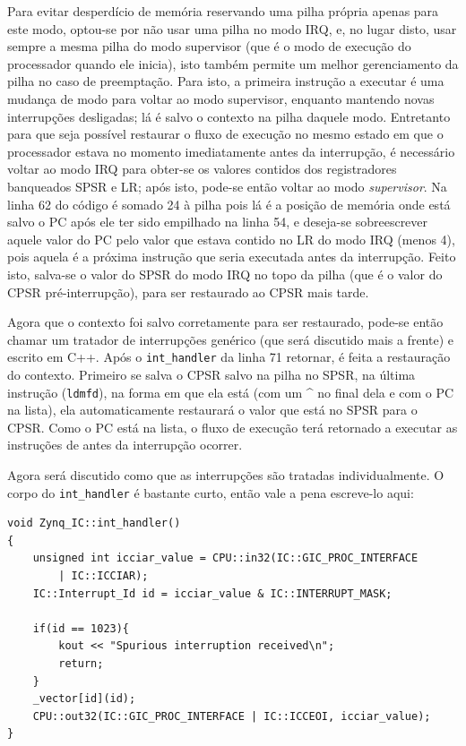 Para evitar desperdício de memória reservando uma pilha própria apenas para este modo, optou-se por não usar uma pilha no modo IRQ, e, no lugar disto, usar sempre a mesma pilha do modo supervisor (que é o modo de execução do processador quando ele inicia), isto também permite um melhor gerenciamento da pilha no caso de preemptação. Para isto, a primeira instrução a executar é uma mudança de modo para voltar ao modo supervisor, enquanto mantendo novas interrupções desligadas; lá é salvo o contexto na pilha daquele modo. Entretanto para que seja possível restaurar o fluxo de execução no mesmo estado em que o processador estava no momento imediatamente antes da interrupção, é necessário voltar ao modo IRQ para obter-se os valores contidos dos registradores banqueados SPSR e LR; após isto, pode-se então voltar ao modo \emph{supervisor}. Na linha 62 do código é somado 24 à pilha pois lá é a posição de memória onde está salvo o PC após ele ter sido empilhado na linha 54, e deseja-se sobreescrever aquele valor do PC pelo valor que estava contido no LR do modo IRQ (menos 4), pois aquela é a próxima instrução que seria executada antes da interrupção. Feito isto, salva-se o valor do SPSR do modo IRQ no topo da pilha (que é o valor do CPSR pré-interrupção), para ser restaurado ao CPSR mais tarde.

Agora que o contexto foi salvo corretamente para ser restaurado, pode-se então chamar um tratador de interrupções genérico (que será discutido mais a frente) e escrito em C++. Após o \verb+int_handler+ da linha 71 retornar, é feita a restauração do contexto. Primeiro se salva o CPSR salvo na pilha no SPSR, na última instrução (\verb+ldmfd+), na forma em que ela está (com um \^{} no final dela e com o PC na lista), ela automaticamente restaurará o valor que está no SPSR para o CPSR. Como o PC está na lista, o fluxo de execução terá retornado a executar as instruções de antes da interrupção ocorrer.

Agora será discutido como que as interrupções são tratadas individualmente. O corpo do \verb+int_handler+ é bastante curto, então vale a pena escreve-lo aqui:

\begin{lstlisting}
void Zynq_IC::int_handler()
{	
    unsigned int icciar_value = CPU::in32(IC::GIC_PROC_INTERFACE 
        | IC::ICCIAR);
    IC::Interrupt_Id id = icciar_value & IC::INTERRUPT_MASK;

    if(id == 1023){
        kout << "Spurious interruption received\n";
        return;
    }
    _vector[id](id);
    CPU::out32(IC::GIC_PROC_INTERFACE | IC::ICCEOI, icciar_value);
}
\end{lstlisting}

